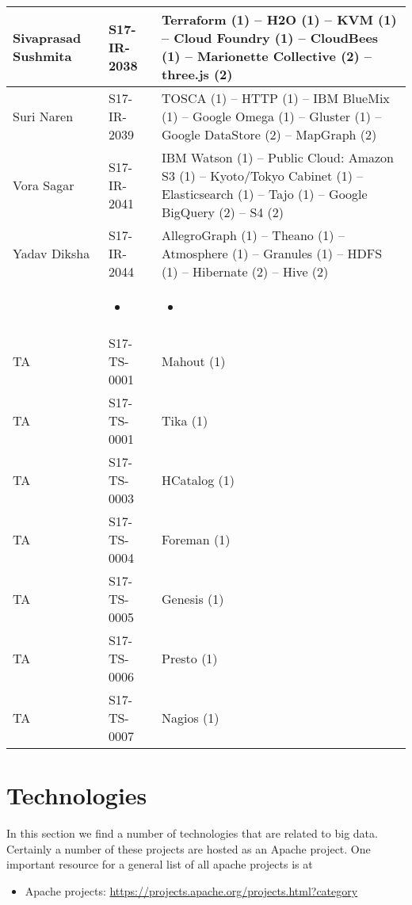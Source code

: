 \begin{longtable}{|*{3}{p{}|}}
\hline
Sivaprasad	Sushmita
&
S17-IR-2038
&
Terraform (1) -- H2O (1) -- KVM (1) -- Cloud Foundry (1) -- CloudBees (1) -- Marionette Collective (2) -- three.js (2)
\\
\hline
Suri	Naren
&
S17-IR-2039
&
TOSCA (1) -- HTTP (1) -- IBM BlueMix (1) -- Google Omega (1) -- Gluster (1) -- Google DataStore (2) -- MapGraph (2)
\\
\hline
Vora	Sagar
&
S17-IR-2041
&
IBM Watson (1) -- Public Cloud: Amazon S3 (1) -- Kyoto/Tokyo Cabinet (1) -- Elasticsearch (1) -- Tajo (1) -- Google BigQuery (2) -- S4 (2)
\\
\hline
Yadav	Diksha
&
S17-IR-2044
&
AllegroGraph (1) -- Theano (1) -- Atmosphere (1) -- Granules (1) -- HDFS (1) -- Hibernate (2) -- Hive (2)
\\
\hline&\begin{itemize}
\item {} 
\end{itemize}
&\begin{itemize}
\item {} 
\end{itemize}
\\
\hline
TA
&
S17-TS-0001
&
Mahout (1)
\\
\hline
TA
&
S17-TS-0001
&
Tika (1)
\\
\hline
TA
&
S17-TS-0003
&
HCatalog (1)
\\
\hline
TA
&
S17-TS-0004
&
Foreman (1)
\\
\hline
TA
&
S17-TS-0005
&
Genesis (1)
\\
\hline
TA
&
S17-TS-0006
&
Presto (1)
\\
\hline
TA
&
S17-TS-0007
&
Nagios (1)
\\
\hline\end{longtable}



\section{Technologies}
\label{\detokenize{i524/technologies:index-0}}\label{\detokenize{i524/technologies:technologies}}\label{\detokenize{i524/technologies::doc}}
In this section we find a number of technologies that are related to
big data. Certainly a number of these projects are hosted as an Apache
project. One important resource for a general list of all apache
projects is at
\begin{itemize}
\item {} 
Apache projects: \url{https://projects.apache.org/projects.html?category}

\end{itemize}


